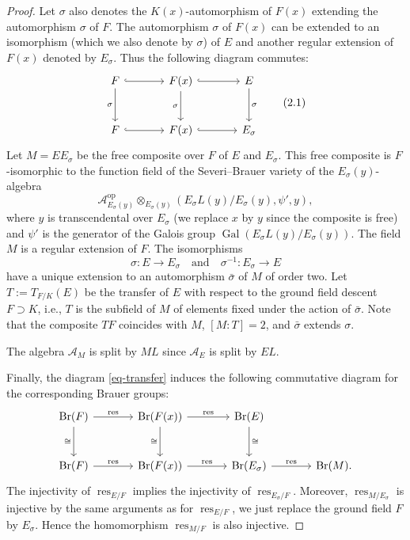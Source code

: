 \documentclass[10pt]{article}
\theoremstyle{definition}
\DeclareMathOperator{\Br}{Br}
\DeclareMathOperator{\Gal}{Gal}
\DeclareMathOperator{\res}{res}
\newcommand{\A}{\mathcal A}
\newcommand{\sourcepage}[1]{\label{source-page-#1}}
\begin{document}
\begin{proof}
Let $\sigma$ also denotes the $K(x)$-automorphism of $F(x)$ extending the automorphism $\sigma$ of $F$. The automorphism $\sigma$ of $F(x)$ can be extended to an isomorphism (which we also denote by $\sigma$) of $E$ and another regular extension of $F(x)$ denoted by $E_\sigma$. Thus the following diagram commutes:
\begin{equation}\label{eq-transfer}
\begin{tikzcd}[column sep=large,row sep=large]
F\arrow[r,hook]\arrow[d,"\sigma"'] & F(x)\arrow[r,hook]\arrow[d,"\sigma"'] & E\arrow[d,"\sigma"]\\
F\arrow[r,hook] & F(x)\arrow[r,hook] & E_\sigma
\end{tikzcd}\tag{2.1}
\end{equation}
\newpage
\sourcepage{4}
Let $M=EE_\sigma$ be the free composite over $F$ of $E$ and $E_\sigma$. This free composite is $F$-isomorphic to the function field of the Severi--Brauer variety of the $E_\sigma(y)$-algebra
\[
\A^{\mathrm{op}}_{E_\sigma(y)}\otimes_{E_\sigma(y)}(E_\sigma L(y)/E_\sigma(y),\psi',y),
\]
where $y$ is transcendental over $E_\sigma$ (we replace $x$ by $y$ since the composite is free) and $\psi'$ is the generator of the Galois group $\Gal(E_\sigma L(y)/E_\sigma(y))$. The field $M$ is a regular extension of $F$. The isomorphisms
\[
\sigma:E\longrightarrow E_\sigma\quad\text{and}\quad\sigma^{-1}:E_\sigma\longrightarrow E
\]
have a unique extension to an automorphism $\bar\sigma$ of $M$ of order two. Let $T:=T_{F/K}(E)$ be the transfer of $E$ with respect to the ground field descent $F\supset K$, i.e., $T$ is the subfield of $M$ of elements fixed under the action of $\bar\sigma$. Note that the composite $TF$ coincides with $M$, $[M:T]=2$, and $\bar\sigma$ extends $\sigma$.

The algebra $\A_M$ is split by $ML$ since $\A_E$ is split by $EL$.

Finally, the diagram \eqref{eq-transfer} induces the following commutative diagram for the corresponding Brauer groups:
\[
\begin{tikzcd}[column sep=large,row sep=large]
\Br(F)\arrow[r,"\res"]\arrow[d,"\cong"'] & \Br(F(x))\arrow[r,"\res"]\arrow[d,"\cong"'] & \Br(E)\arrow[d,"\cong"] & {}\\
\Br(F)\arrow[r,"\res"] & \Br(F(x))\arrow[r,"\res"] & \Br(E_\sigma)\arrow[r,"\res"] & \Br(M).
\end{tikzcd}
\]
The injectivity of $\res_{E/F}$ implies the injectivity of $\res_{E_\sigma/F}$. Moreover, $\res_{M/E_\sigma}$ is injective by the same arguments as for $\res_{E/F}$, we just replace the ground field $F$ by $E_\sigma$. Hence the homomorphism $\res_{M/F}$ is also injective.
\end{proof}
\end{document}

